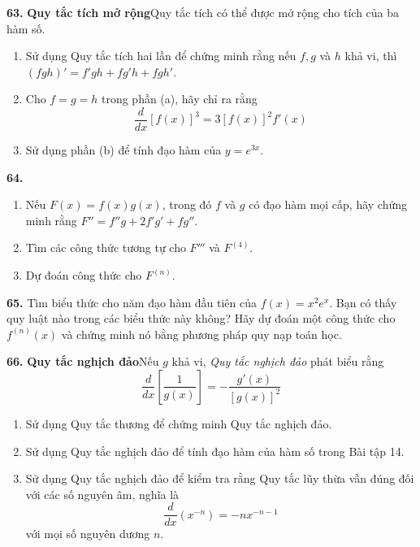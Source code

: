 \hfill
\begin{minipage}[t]{0.485\textwidth}
    \fontsize{8.5pt}{11pt}\selectfont
    \textbf{63.} \textbf{Quy tắc tích mở rộng}\enspace Quy tắc tích có thể được mở rộng cho tích của ba hàm số.
    \begin{enumerate}[label=\textbf{(\alph*)}, leftmargin=*, itemsep=1.5pt, topsep=1.5pt, parsep=0pt]
        \item Sử dụng Quy tắc tích hai lần để chứng minh rằng nếu $f, g$ và $h$ khả vi, thì $(fgh)' = f'gh + fg'h + fgh'$.
        \item Cho $f = g = h$ trong phần (a), hãy chỉ ra rằng
        \[
        \frac{d}{dx} [f(x)]^3 = 3[f(x)]^2 f'(x)
        \]
        \item Sử dụng phần (b) để tính đạo hàm của $y = e^{3x}$.
    \end{enumerate}

    \vspace{0.7em}
    \textbf{64.}
    \begin{enumerate}[label=\textbf{(\alph*)}, leftmargin=*, itemsep=1.5pt, topsep=1.5pt, parsep=0pt]
        \item Nếu $F(x) = f(x)g(x)$, trong đó $f$ và $g$ có đạo hàm mọi cấp, hãy chứng minh rằng $F'' = f''g + 2f'g' + fg''$.
        \item Tìm các công thức tương tự cho $F'''$ và $F^{(4)}$.
        \item Dự đoán công thức cho $F^{(n)}$.
    \end{enumerate}

    \vspace{0.7em}
    \textbf{65.} Tìm biểu thức cho năm đạo hàm đầu tiên của $f(x) = x^2 e^x$. Bạn có thấy quy luật nào trong các biểu thức này không? Hãy dự đoán một công thức cho $f^{(n)}(x)$ và chứng minh nó bằng phương pháp quy nạp toán học.

    \vspace{0.7em}
    \textbf{66.} \textbf{Quy tắc nghịch đảo}\enspace Nếu $g$ khả vi, \textit{Quy tắc nghịch đảo} phát biểu rằng
    \[
    \frac{d}{dx}\left[\frac{1}{g(x)}\right] = -\frac{g'(x)}{[g(x)]^2}
    \]
    \begin{enumerate}[label=\textbf{(\alph*)}, leftmargin=*, itemsep=1.5pt, topsep=1.5pt, parsep=0pt]
        \item Sử dụng Quy tắc thương để chứng minh Quy tắc nghịch đảo.
        \item Sử dụng Quy tắc nghịch đảo để tính đạo hàm của hàm số trong Bài tập 14.
        \item Sử dụng Quy tắc nghịch đảo để kiểm tra rằng Quy tắc lũy thừa vẫn đúng đối với các số nguyên âm, nghĩa là
        \[
        \frac{d}{dx}(x^{-n}) = -n x^{-n-1}
        \]
        với mọi số nguyên dương $n$.
    \end{enumerate}
\end{minipage}

